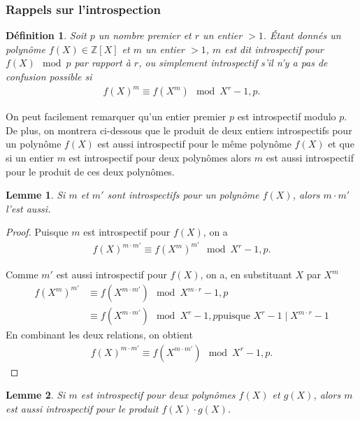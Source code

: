 \documentclass[11pt]{article}
\newtheorem{lemm}{Lemme}[subsection]
\newtheorem{defi}{Définition}[subsection]
\begin{document}
\subsubsection{Rappels sur l'introspection}

\begin{defi}
Soit $p$ un nombre premier et $r$ un entier $> 1$. Étant donnés un polynôme $f(X) \in \mathbb{Z}[X]$ et $m$ un entier $> 1$, $m$ est dit introspectif pour $f(X) \mod p$ par rapport à $r$, ou simplement introspectif s'il n'y a pas de confusion possible si
\begin{align*}
f(X)^m \equiv f(X^m) \mod X^r-1,p.
\end{align*}
\end{defi}

On peut facilement remarquer qu'un entier premier $p$ est introspectif modulo $p$. De plus, on montrera ci-dessous que le produit de deux entiers introspectifs pour un polynôme $f(X)$ est aussi introspectif pour le même polynôme $f(X)$ et que si un entier $m$ est introspectif pour deux polynômes alors $m$ est aussi introspectif pour le produit de ces deux polynômes.\\

\begin{lemm}
Si $m$ et $m'$ sont introspectifs pour un polynôme $f(X)$, alors $m \cdot m'$ l'est aussi.
\end{lemm}

\begin{small}
\begin{proof}
Puisque $m$ est introspectif pour $f(X)$, on a
\begin{align*}
f(X)^{m \cdot m'} \equiv f(X^m)^{m'} \mod X^r-1,p.
\end{align*}

\noindent
Comme $m'$ est aussi introspectif pour $f(X)$, on a, en substituant $X$ par $X^m$
\begin{align*}
f(X^m)^{m'} &\equiv f(X^{m \cdot m'}) \mod X^{m \cdot r}-1,p\\
&\equiv f(X^{m \cdot m'}) \mod X^r-1,p \text{puisque $X^r-1 \mid X^{m \cdot r}-1$}
\end{align*}
\noindent
En combinant les deux relations, on obtient
\begin{align*}
f(X)^{m \cdot m'} \equiv f(X^{m \cdot m'}) \mod X^r-1,p.
\end{align*}
\end{proof}
\end{small}

\begin{lemm}
Si $m$ est introspectif pour deux polynômes $f(X)$ et $g(X)$, alors $m$ est aussi introspectif pour le produit $f(X) \cdot g(X)$.
\end{lemm}
\end{document}
